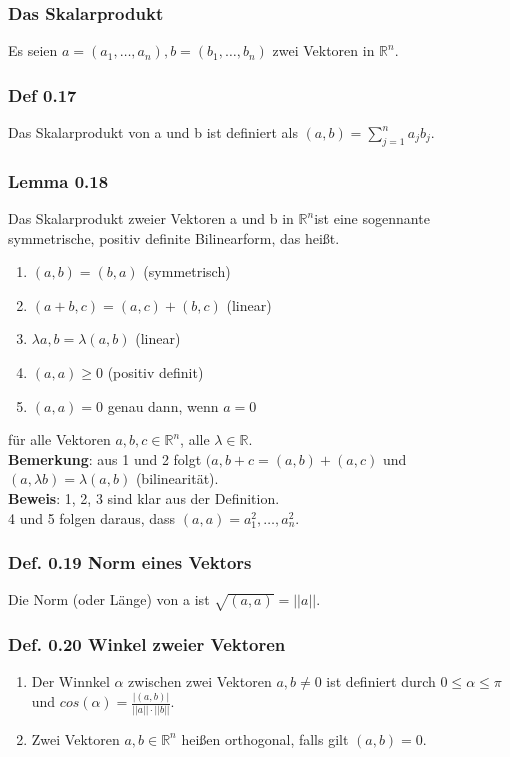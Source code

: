 \documentclass{article}
\newcommand{\lb}{\lambda}
\newcommand{\R}{\mathbb{R}}
\newcommand{\Rn}{\mathbb{R}^n}
\newcommand{\mRn}{$\mathbb{R}^n$}
\newcommand{\al}{\alpha}
\begin{document}
\subsubsection{Das Skalarprodukt}
Es seien $a = (a_1, \dots, a_n), b = (b_1, \dots, b_n)$ zwei Vektoren in \mRn.\\

\subsubsection{Def 0.17}
Das Skalarprodukt von a und b ist definiert als $(a, b) = \sum_{j=1}^n a_j b_j$.

\subsubsection{Lemma 0.18}
Das Skalarprodukt zweier Vektoren a und b in \mRn ist eine sogennante symmetrische, positiv definite Bilinearform, das hei\ss{}t.
\begin{enumerate}
\item{$(a, b) = (b, a)$ (symmetrisch)}
\item{$(a + b, c) = (a, c) + (b, c)$ (linear)}
\item{$\lb a, b = \lb(a, b)$ (linear)}
\item{$(a, a) \ge 0$ (positiv definit)}
\item{$(a, a) = 0$ genau dann, wenn $a=0$}
\end{enumerate}
für alle Vektoren $a, b, c \in \Rn$, alle $\lb \in \R$.\\
\textbf{Bemerkung}: aus 1 und 2 folgt $(a, b+c = (a,b) + (a,c)$ und $(a, \lb b) = \lb (a, b)$ (bilinearität).\\
\textbf{Beweis}: 1, 2, 3 sind klar aus der Definition.\\
4 und 5 folgen daraus, dass $(a, a) = a_1^2, \dots, a_n^2$.\\

\subsubsection{Def. 0.19 Norm eines Vektors}
Die Norm (oder Länge) von a ist $\sqrt{(a, a)} = ||a||$.

\subsubsection{Def. 0.20 Winkel zweier Vektoren}
\begin{enumerate}
\item {
Der Winnkel $\al$ zwischen zwei Vektoren $a, b \neq 0$ ist definiert durch $0 \le \al \le \pi$ und $cos(\al) = \frac{|(a,b)|}{||a||\cdot ||b||}$.}
\item{
Zwei Vektoren $a, b \in \R^n$ hei\ss{}en orthogonal, falls gilt $(a, b) = 0$.
}
\end{enumerate}
\end{document}
